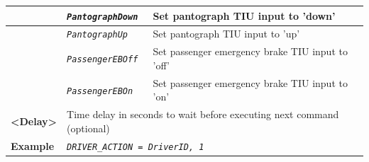 \begin{itemize}
\begin{longtable}{|l|l|l|}
			\hline

			&	\begin{minipage}[t]{0.30\linewidth} \emph{\texttt{PantographDown}} \end{minipage}
			&	\begin{minipage}[t]{0.38\linewidth} Set pantograph TIU input to ’down’ \end{minipage} \\

			\hline

			&	\begin{minipage}[t]{0.30\linewidth} \emph{\texttt{PantographUp}} \end{minipage}
			&	\begin{minipage}[t]{0.38\linewidth} Set pantograph TIU input to ’up’ \end{minipage} \\

			\hline

			&	\begin{minipage}[t]{0.30\linewidth} \emph{\texttt{PassengerEBOff}} \end{minipage}
			&	\begin{minipage}[t]{0.38\linewidth} Set passenger emergency brake TIU input to ’off’ \end{minipage} \\

			\hline

			&	\begin{minipage}[t]{0.30\linewidth} \emph{\texttt{PassengerEBOn}} \end{minipage}
			&	\begin{minipage}[t]{0.38\linewidth} Set passenger emergency brake TIU input to ’on’ \end{minipage} \\

			\hline

				\begin{minipage}[t]{0.22\linewidth} \textbf{<Delay>} \end{minipage}
			&	\multicolumn{2}{l|}{ \begin{minipage}[t]{0.78\linewidth} Time delay in seconds to wait before executing next command (optional) \end{minipage} } \\

			\hline

				\begin{minipage}[t]{0.22\linewidth} \textbf{Example} \end{minipage}
			&	\multicolumn{2}{l|}{ \begin{minipage}[t]{0.78\linewidth} \emph{\texttt{DRIVER\_ACTION = DriverID, 1}} \end{minipage} } \\


\end{longtable}
\end{itemize}
